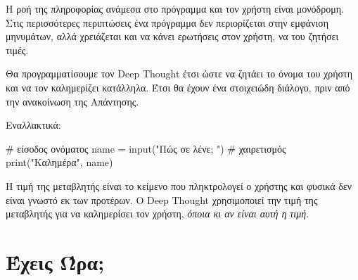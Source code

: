 \documentclass[a4paper,11pt,oneside]{book}
\begin{document}
Η ροή της πληροφορίας ανάμεσα στο πρόγραμμα και τον χρήστη είναι μονόδρομη. Στις περισσότερες περιπτώσεις ένα πρόγραμμα δεν περιορίζεται στην εμφάνιση μηνυμάτων, αλλά χρειάζεται και να κάνει ερωτήσεις στον χρήστη, να του ζητήσει τιμές.

Θα προγραμματίσουμε τον Deep Thought έτσι ώστε να ζητάει το όνομα του χρήστη και να τον καλημερίζει κατάλληλα. Έτσι θα έχουν ένα στοιχειώδη διάλογο, πριν από την ανακοίνωση της Απάντησης.


Εναλλακτικά:

%
\begin{pycode}
# είσοδος ονόματος
name = input("Πώς σε λένε; ")
# χαιρετισμός
print("Καλημέρα", name)
\end{pycode}

Η τιμή της μεταβλητής  είναι το κείμενο που πληκτρολογεί ο χρήστης και φυσικά δεν είναι γνωστό εκ των προτέρων. O Deep Thought χρησιμοποιεί την τιμή της μεταβλητής  για να καλημερίσει τον χρήστη, \emph{όποια κι αν είναι αυτή η τιμή}.



\section{Έχεις Ώρα;}
\end{document}
